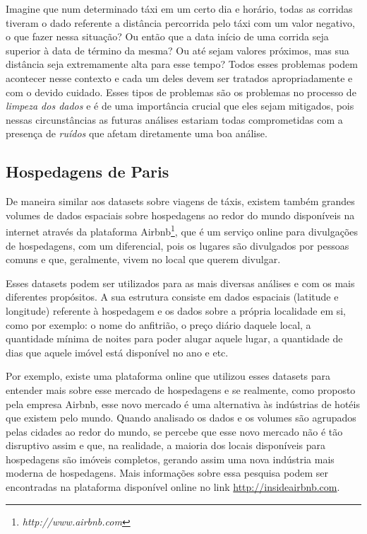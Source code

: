 Imagine que num determinado táxi em um certo dia e horário, todas as corridas tiveram o dado referente a distância percorrida pelo táxi com um valor negativo, o que fazer nessa situação? Ou então que a data início de uma corrida seja superior à data de término da mesma? Ou até sejam valores próximos, mas sua distância seja extremamente alta para esse tempo? Todos esses problemas podem acontecer nesse contexto e cada um deles devem ser tratados apropriadamente e com o devido cuidado. Esses tipos de problemas são os problemas no processo de \textit{limpeza dos dados} e é de uma importância crucial que eles sejam mitigados, pois nessas circunstâncias as futuras análises estariam todas comprometidas com a presença de \textit{ruídos} que afetam diretamente uma boa análise.

\subsection{Hospedagens de Paris}

De maneira similar aos datasets sobre viagens de táxis, existem também grandes volumes de dados espaciais sobre hospedagens ao redor do mundo disponíveis na internet através da plataforma Airbnb\footnote{\it http://www.airbnb.com}, que é um serviço online para divulgações de hospedagens, com um diferencial, pois os lugares são divulgados por pessoas comuns e que, geralmente, vivem no local que querem divulgar.

Esses datasets podem ser utilizados para as mais diversas análises e com os mais diferentes propósitos. A sua estrutura consiste em dados espaciais (latitude e longitude) referente à hospedagem e os dados sobre a própria localidade em si, como por exemplo: o nome do anfitrião, o preço diário daquele local, a quantidade mínima de noites para poder alugar aquele lugar, a quantidade de dias que aquele imóvel está disponível no ano e etc.

Por exemplo, existe uma plataforma online que utilizou esses datasets para entender mais sobre esse mercado de hospedagens e se realmente, como proposto pela empresa Airbnb, esse novo mercado é uma alternativa às indústrias de hotéis que existem pelo mundo. Quando analisado os dados e os volumes são agrupados pelas cidades ao redor do mundo, se percebe que esse novo mercado não é tão disruptivo assim e que, na realidade, a maioria dos locais disponíveis para hospedagens são imóveis completos, gerando assim uma nova indústria mais moderna de hospedagens. Mais informações sobre essa pesquisa podem ser encontradas na plataforma disponível online no link \url{http://insideairbnb.com}.


